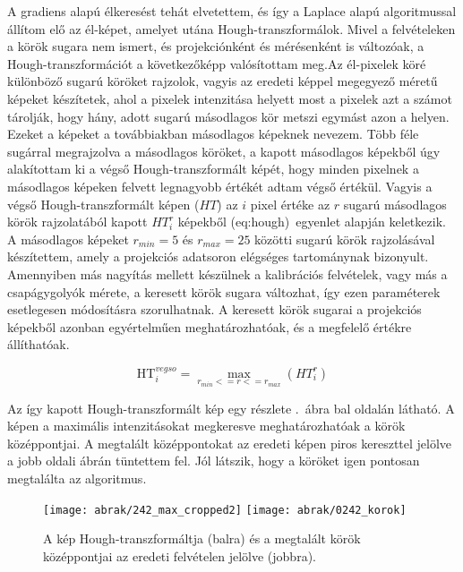 \documentclass[a4paper,12pt]{article}
\begin{document}
A gradiens alapú élkeresést tehát elvetettem, és így a Laplace alapú algoritmussal állítom elő az él-képet, amelyet utána Hough-transzformálok. Mivel a felvételeken a körök sugara nem ismert, és projekciónként és mérésenként is változóak, a Hough-transzformációt a következőképp valósítottam meg.Az él-pixelek köré különböző sugarú köröket rajzolok, vagyis az eredeti képpel megegyező méretű képeket készítetek, ahol a pixelek intenzitása helyett most a pixelek azt a számot tárolják, hogy hány, adott sugarú másodlagos kör metszi egymást azon a helyen. Ezeket a képeket a továbbiakban másodlagos képeknek nevezem. Több féle sugárral megrajzolva a másodlagos köröket, a kapott másodlagos képekből úgy alakítottam ki a végső Hough-transzformált képét, hogy minden pixelnek a másodlagos képeken felvett legnagyobb értékét adtam végső értékül. Vagyis a végső Hough-transzformált képen ($HT$) az $i$ pixel értéke az $r$ sugarú másodlagos körök rajzolatából kapott $HT^r_i$ képekből \aref({eq:hough})~egyenlet alapján keletkezik. A másodlagos képeket $r_{min} = 5$ és $r_{max}=25$ közötti sugarú körök rajzolásával készítettem, amely a projekciós adatsoron elégséges tartománynak bizonyult. Amennyiben más nagyítás mellett készülnek a kalibrációs felvételek, vagy más a csapágygolyók mérete, a keresett körök sugara változhat, így ezen paraméterek esetlegesen módosításra szorulhatnak. A keresett körök sugarai a projekciós képekből azonban egyértelműen meghatározhatóak, és a megfelelő értékre állíthatóak.


\begin{equation}
\label{eq:hough}
\text{HT}_i^{vegso} = \max_{r_{min}<=r<=r_{max}} \left(HT^r_i \right)
\end{equation}


Az így kapott Hough-transzformált kép egy részlete .~ábra bal oldalán látható. A képen a maximális intenzitásokat megkeresve meghatározhatóak a körök középpontjai. A megtalált középpontokat az eredeti képen piros kereszttel jelölve a jobb oldali ábrán tüntettem fel. Jól látszik, hogy a köröket igen pontosan megtalálta az algoritmus.

\begin{figure}[htbp]
\center
\texttt{[image: abrak/242\_max\_cropped2]}
\texttt{[image: abrak/0242\_korok]}
\caption{A kép Hough-transzformáltja (balra) és a megtalált körök középpontjai az eredeti felvételen jelölve (jobbra).}
\label{fig:242_hough}
\end{figure}
\end{document}
